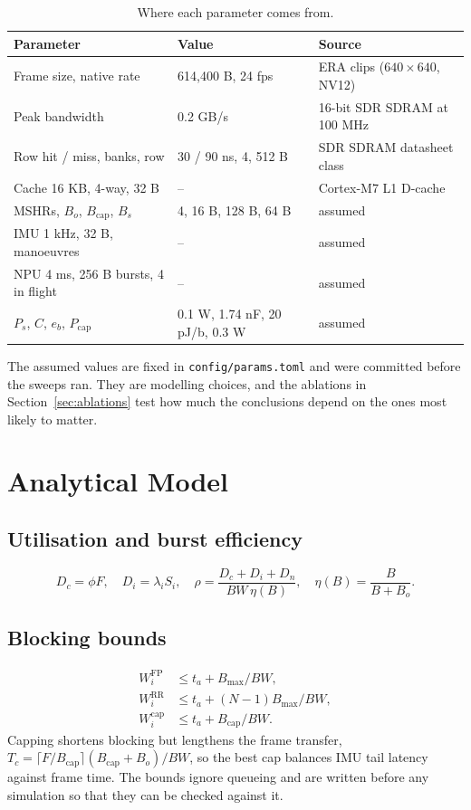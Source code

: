 \documentclass[11pt,a4paper]{article}
\begin{document}
\begin{table}[ht]\centering\footnotesize\caption{Where each parameter comes from.}
\begin{tabular}{@{}lll@{}}\toprule Parameter & Value & Source\\\midrule
Frame size, native rate & 614{,}400 B, 24 fps & ERA clips ($640\times640$, NV12)\\
Peak bandwidth & 0.2 GB/s & 16-bit SDR SDRAM at 100 MHz\\
Row hit / miss, banks, row & 30 / 90 ns, 4, 512 B & SDR SDRAM datasheet class\\
Cache 16 KB, 4-way, 32 B & -- & Cortex-M7 L1 D-cache\\
MSHRs, $B_o$, $B_{\mathrm{cap}}$, $B_s$ & 4, 16 B, 128 B, 64 B & assumed\\
IMU 1 kHz, 32 B, manoeuvres & -- & assumed\\
NPU 4 ms, 256 B bursts, 4 in flight & -- & assumed\\
$P_s$, $C$, $e_b$, $P_{\mathrm{cap}}$ & 0.1 W, 1.74 nF, 20 pJ/b, 0.3 W & assumed\\\bottomrule
\end{tabular}\end{table}
The assumed values are fixed in \texttt{config/params.toml} and were committed before the sweeps ran. They are modelling choices, and the ablations in Section~\ref{sec:ablations} test how much the conclusions depend on the ones most likely to matter.

\section{Analytical Model}\label{sec:model}
\subsection{Utilisation and burst efficiency}
\begin{equation}
D_c=\phi F,\quad D_i=\lambda_i S_i,\quad \rho=\frac{D_c+D_i+D_n}{BW\,\eta(B)},\quad \eta(B)=\frac{B}{B+B_o}.
\end{equation}
\subsection{Blocking bounds}
\begin{align}
W^{\mathrm{FP}}_i&\le t_a+B_{\max}/BW,\\
W^{\mathrm{RR}}_i&\le t_a+(N-1)B_{\max}/BW,\\
W^{\mathrm{cap}}_i&\le t_a+B_{\mathrm{cap}}/BW.\label{eq:cap}
\end{align}
Capping shortens blocking but lengthens the frame transfer, $T_c=\lceil F/B_{\mathrm{cap}}\rceil(B_{\mathrm{cap}}+B_o)/BW$, so the best cap balances IMU tail latency against frame time. The bounds ignore queueing and are written before any simulation so that they can be checked against it.
\end{document}

